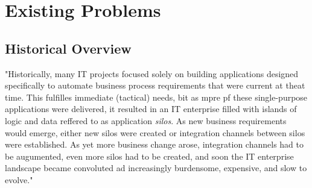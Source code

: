 \documentclass[12pt]{article}
\begin{document}
\section{Existing Problems}
\subsection{Historical Overview}
"Historically, many IT projects focused solely on building applications designed specifically to automate business process requirements that were current at theat time. This fulfilles immediate (tactical) needs, bit as mpre pf these single-purpose applications were delivered, it resulted in an IT enterprise filled with islands of logic and data reffered to as application \textit{silos}. As new business requirements would emerge, either new silos were created or integration channels between silos were established. As yet more business change arose, integration channels had to be augumented, even more silos had to be created, and soon the IT enterprise landscape became convoluted ad increasingly burdensome, expensive, and slow to evolve."\cite[page 522]{grau} 
\end{document}
